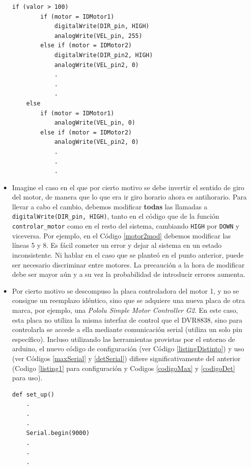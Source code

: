 \begin{itemize}
\begin{lstlisting}[caption=Modificación de la función controlar\_motor para cambiar comportamiento al utilizar el motor 2.,label={motor2mod}]
	if (valor > 100)
		if (motor = IDMotor1)
    		digitalWrite(DIR_pin, HIGH)
	    	analogWrite(VEL_pin, 255)
		else if (motor = IDMotor2)
	    	digitalWrite(DIR_pin2, HIGH)
	    	analogWrite(VEL_pin2, 0)
	    	.
	    	.
	    	.
	else
		if (motor = IDMotor1)
	    	analogWrite(VEL_pin, 0)
		else if (motor = IDMotor2)
	    	analogWrite(VEL_pin2, 0)
	    	.
	    	.
	    	.

\end{lstlisting}
	\item Imagine el caso en el que por cierto motivo se debe invertir el sentido de giro del motor, de manera que lo que era ir giro horario ahora es antihorario. Para llevar a cabo el cambio, debemos modificar \textbf{todas} las llamadas a \verb|digitalWrite(DIR_pin, HIGH)|, tanto en el código que de la función \verb|controlar_motor| como en el resto del sistema, cambiando \verb|HIGH| por \verb|DOWN| y viceversa. Por ejemplo, en el Código \ref{motor2mod} debemos modificar las líneas 5 y 8. Es fácil cometer un error y dejar al sistema en un estado inconsistente. Ni hablar en el caso que se planteó en el punto anterior, puede ser necesario discriminar entre motores. La precaución a la hora de modificar debe ser mayor aún y a su vez la probabilidad de introducir errores aumenta.
   
    \item Por cierto motivo se descompuso la placa controladora del motor 1, y no se consigue un reemplazo idéntico, sino que se adquiere una nueva placa de otra marca, por ejemplo, una \textit{Pololu Simple Motor Controller G2}. En este caso, esta placa no utiliza la misma interfaz de control que el \gls{DVR8838}, sino para controlarla se accede a ella mediante comunicación serial (utiliza un solo pin específico). Incluso utilizando las herramientas provistas por el entorno de \gls{arduino}, el nuevo código de configuración (ver Código \ref{listingDistinto}) y uso (ver Códigos \ref{maxSerial} y \ref{detSerial}) difiere significativamente del anterior (Codigo \ref{listing1} para configuración y Codigos \ref{codigoMax} y \ref{codigoDet} para uso).
\begin{lstlisting}[caption=Configuración de la placa de control del motor DC utiliza comunicación serie., label={listingDistinto}]
def set_up() 
    .
    .
    .
    Serial.begin(9000)
    .
    .
    .


\end{lstlisting}
\end{itemize}
